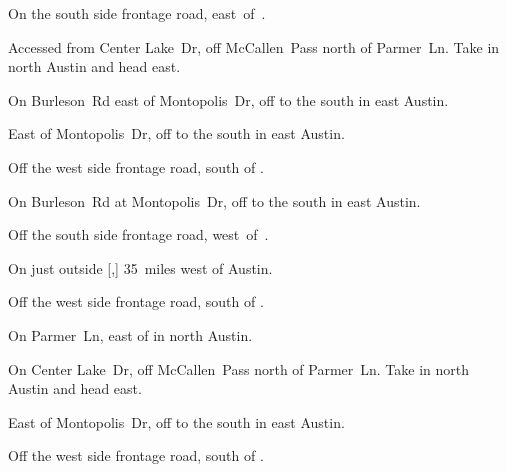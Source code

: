 
\begin{LocationList}

On the south side  frontage road, east~of~.

Accessed from Center Lake~Dr, off McCallen~Pass north of  Parmer~Ln.
Take   in north Austin and head east.

On Burleson~Rd east of Montopolis~Dr, off  to the south in east Austin.

East of Montopolis~Dr, off  to the south in east Austin.

\Location{\GarageHQ \Garage}
Off the west side  frontage road, south of .

\Location{\GasStation \Gas \Rest}
On Burleson~Rd at Montopolis~Dr, off  to the south in east Austin.

Off the south side  frontage road, west~of~.

On  just outside [,] 35~miles west of Austin.

Off the west side  frontage road, south of .

On  Parmer~Ln, east of   in north Austin.

On Center Lake~Dr, off McCallen~Pass north of  Parmer~Ln.
Take   in north Austin and head east.

East of Montopolis~Dr, off  to the south in east Austin.

Off the west side  frontage road, south of .

\end{LocationList}
